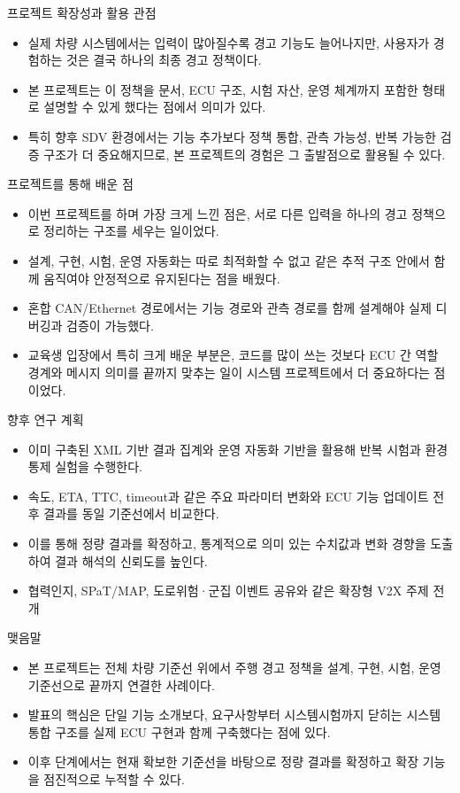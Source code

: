 \documentclass[aspectratio=169,10pt]{beamer}
\begin{document}
\begin{frame}{프로젝트 확장성과 활용 관점}
\begin{itemize}
  \item 실제 차량 시스템에서는 입력이 많아질수록 경고 기능도 늘어나지만, 사용자가 경험하는 것은 결국 하나의 최종 경고 정책이다.
  \item 본 프로젝트는 이 정책을 문서, ECU 구조, 시험 자산, 운영 체계까지 포함한 형태로 설명할 수 있게 했다는 점에서 의미가 있다.
  \item 특히 향후 SDV 환경에서는 기능 추가보다 정책 통합, 관측 가능성, 반복 가능한 검증 구조가 더 중요해지므로, 본 프로젝트의 경험은 그 출발점으로 활용될 수 있다.
\end{itemize}
\end{frame}

\begin{frame}{프로젝트를 통해 배운 점}
\begin{itemize}
  \item 이번 프로젝트를 하며 가장 크게 느낀 점은, 서로 다른 입력을 하나의 경고 정책으로 정리하는 구조를 세우는 일이었다.
  \item 설계, 구현, 시험, 운영 자동화는 따로 최적화할 수 없고 같은 추적 구조 안에서 함께 움직여야 안정적으로 유지된다는 점을 배웠다.
  \item 혼합 CAN/Ethernet 경로에서는 기능 경로와 관측 경로를 함께 설계해야 실제 디버깅과 검증이 가능했다.
  \item 교육생 입장에서 특히 크게 배운 부분은, 코드를 많이 쓰는 것보다 ECU 간 역할 경계와 메시지 의미를 끝까지 맞추는 일이 시스템 프로젝트에서 더 중요하다는 점이었다.
\end{itemize}
\end{frame}

\begin{frame}{향후 연구 계획}
\begin{itemize}
  \item 이미 구축된 XML 기반 결과 집계와 운영 자동화 기반을 활용해 반복 시험과 환경 통제 실험을 수행한다.
  \item 속도, ETA, TTC, timeout과 같은 주요 파라미터 변화와 ECU 기능 업데이트 전후 결과를 동일 기준선에서 비교한다.
  \item 이를 통해 정량 결과를 확정하고, 통계적으로 의미 있는 수치값과 변화 경향을 도출하여 결과 해석의 신뢰도를 높인다.
  \item 협력인지, SPaT/MAP, 도로위험·군집 이벤트 공유와 같은 확장형 V2X 주제 전개
\end{itemize}
\end{frame}

\begin{frame}{맺음말}
\begin{itemize}
  \item 본 프로젝트는 전체 차량 기준선 위에서 주행 경고 정책을 설계, 구현, 시험, 운영 기준선으로 끝까지 연결한 사례이다.
  \item 발표의 핵심은 단일 기능 소개보다, 요구사항부터 시스템시험까지 닫히는 시스템 통합 구조를 실제 ECU 구현과 함께 구축했다는 점에 있다.
  \item 이후 단계에서는 현재 확보한 기준선을 바탕으로 정량 결과를 확정하고 확장 기능을 점진적으로 누적할 수 있다.
\end{itemize}
\end{frame}
\end{document}
